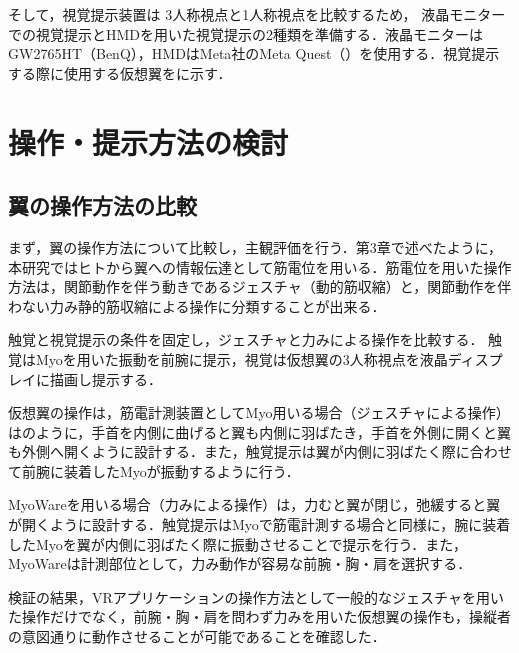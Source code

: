     そして，視覚提示装置は
    3人称視点と1人称視点を比較するため，
    液晶モニターでの視覚提示とHMDを用いた視覚提示の2種類を準備する．液晶モニターはGW2765HT（BenQ），HMDはMeta社のMeta Quest（）\cite{OculusQuest}を使用する．視覚提示する際に使用する仮想翼をに示す．

\section{操作・提示方法の検討}
    \subsection{翼の操作方法の比較}
        まず，翼の操作方法について比較し，主観評価を行う．第3章で述べたように，本研究ではヒトから翼への情報伝達として筋電位を用いる．筋電位を用いた操作方法は，関節動作を伴う動きであるジェスチャ（動的筋収縮）と，関節動作を伴わない力み静的筋収縮\cite{thistle1967isokinetic}による操作に分類することが出来る．

        触覚と視覚提示の条件を固定し，ジェスチャと力みによる操作を比較する． 触覚はMyoを用いた振動を前腕に提示，視覚は仮想翼の3人称視点を液晶ディスプレイに描画し提示する．

        仮想翼の操作は，筋電計測装置としてMyo用いる場合（ジェスチャによる操作）はのように，手首を内側に曲げると翼も内側に羽ばたき，手首を外側に開くと翼も外側へ開くように設計する．また，触覚提示は翼が内側に羽ばたく際に合わせて前腕に装着したMyoが振動するように行う．
        
        MyoWareを用いる場合（力みによる操作）は，力むと翼が閉じ，弛緩すると翼が開くように設計する．触覚提示はMyoで筋電計測する場合と同様に，腕に装着したMyoを翼が内側に羽ばたく際に振動させることで提示を行う．また，MyoWareは計測部位として，力み動作が容易な前腕・胸・肩を選択する．

        検証の結果，VRアプリケーションの操作方法として一般的なジェスチャを用いた操作だけでなく，前腕・胸・肩を問わず力みを用いた仮想翼の操作も，操縦者の意図通りに動作させることが可能であることを確認した．

